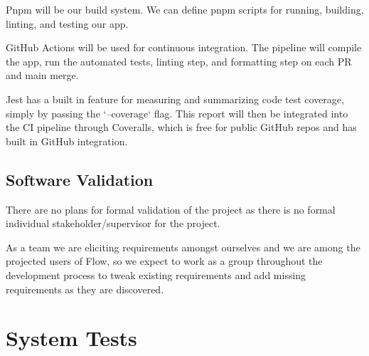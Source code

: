 \documentclass[12pt, titlepage]{article}
\begin{document}
Pnpm will be our build system. We can define pnpm scripts for running,
building, linting, and testing our app.

GitHub Actions will be used for continuous integration. The pipeline will
compile the app, run the automated tests, linting step, and formatting step on
each PR and main merge.

Jest has a built in feature for measuring and summarizing code test coverage,
simply by passing the `--coverage` flag. This report will then be integrated
into the CI pipeline through Coveralls, which is free for public GitHub repos
and has built in GitHub integration.

\subsection{Software Validation}






There are no plans for formal validation of the project as there is no formal
individual stakeholder/supervisor for the project.

As a team we are eliciting requirements amongst ourselves and we are among the
projected users of Flow, so we expect to work as a group throughout the
development process to tweak existing requirements and add missing requirements
as they are discovered.

\section{System Tests}
\end{document}

